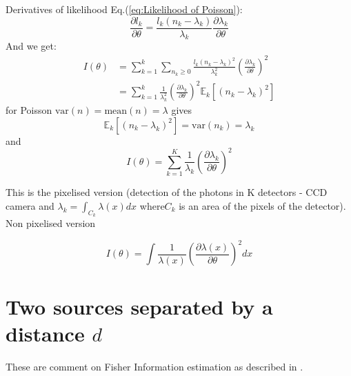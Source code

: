 Derivatives of likelihood Eq.(\ref{eq:Likelihood of Poisson}): 
%
\begin{equation}
	\frac{\partial l_{k}}{\partial\theta}=\frac{l_{k}(n_{k}-\lambda_{k})}{\lambda_{k}}\frac{\partial\lambda_{k}}{\partial\theta}
\end{equation}
%
And we get:
%
\begin{align*}
	I(\theta) & =\sum_{k=1}^{k}\sum_{n_{k}\geq0}\frac{l_{k}(n_{k}-\lambda_{k})^{2}}{\lambda_{k}^{2}}\left(\frac{\partial\lambda_{k}}{\partial\theta}\right)^{2}\\
	 & =\sum_{k=1}^{k}\frac{1}{\lambda_{k}^{2}}\left(\frac{\partial\lambda_{k}}{\partial\theta}\right)^{2}\mathbb{E}_{k}\left[(n_{k}-\lambda_{k})^{2}\right]
\end{align*}
%
for Poisson $\mathrm{var}(n)=\mathrm{mean}(n)=\lambda$ gives 
%
\begin{equation}
	\mathbb{E}_{k}\left[(n_{k}-\lambda_{k})^{2}\right]=\textrm{var}(n_{k})=\lambda_{k}
\end{equation}
%
and
% 
\begin{equation}
	I(\theta)=\sum_{k=1}^{K}\frac{1}{\lambda_{k}}\left(\frac{\partial\lambda_{k}}{\partial\theta}\right)^{2}\label{eq:Fisher Info for Poisson}
\end{equation}

This is the pixelised version (detection of the photons in K detectors - CCD camera and $\lambda_{k}=\int_{C_{k}}\lambda(x)dx$ where$C_{k}$ is an area of the pixels of the detector). Non pixelised version \citep{Ram2006}

\begin{equation}
	I(\theta)=\int\frac{1}{\lambda(x)}\left(\frac{\partial\lambda(x)}{\partial\theta}\right)^{2}dx
\end{equation}

\section{Two sources separated by a distance $d$\label{sub:Appendix Two-sources-separated}}

These are comment on Fisher Information estimation as described in \citep{Ram2006}.

